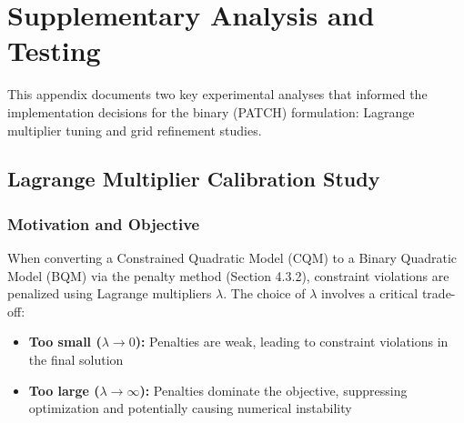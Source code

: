 \documentclass{article}
\begin{document}



\newpage
\appendix

\section{Supplementary Analysis and Testing}

This appendix documents two key experimental analyses that informed the implementation decisions for the binary (PATCH) formulation: Lagrange multiplier tuning and grid refinement studies.

\subsection{Lagrange Multiplier Calibration Study}

\subsubsection{Motivation and Objective}

When converting a Constrained Quadratic Model (CQM) to a Binary Quadratic Model (BQM) via the penalty method (Section 4.3.2), constraint violations are penalized using Lagrange multipliers $\lambda$. The choice of $\lambda$ involves a critical trade-off:

\begin{itemize}
    \item \textbf{Too small ($\lambda \to 0$):} Penalties are weak, leading to constraint violations in the final solution
    \item \textbf{Too large ($\lambda \to \infty$):} Penalties dominate the objective, suppressing optimization and potentially causing numerical instability
\end{itemize}
\end{document}
